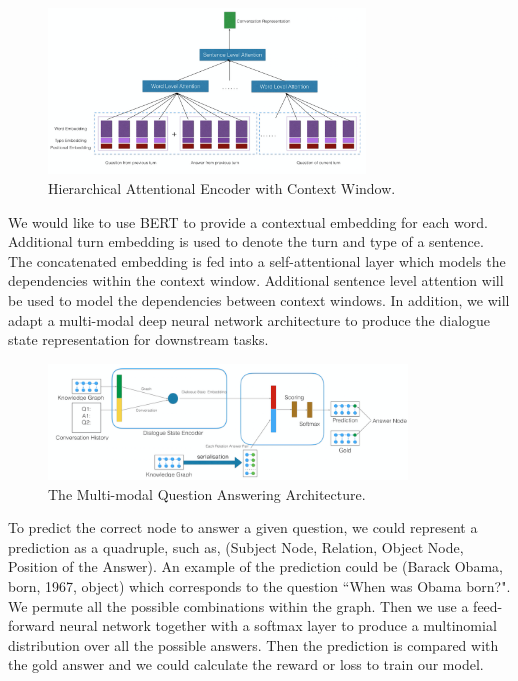 \documentclass[bsc,frontabs,twoside,singlespacing,parskip,deptreport]{infthesis}     %
\begin{document}
\begin{figure}[h]
    \centering
    \includegraphics[width=0.75\textwidth]{attemodel.png}
    \caption{Hierarchical Attentional Encoder with Context Window.}
    \label{fig:mesh1}
\end{figure}

We would like to use BERT\cite{devlin2018bert} to provide a contextual embedding for each word. Additional turn embedding is used to denote the turn and type of a sentence. The concatenated embedding is fed into a self-attentional layer which models the dependencies within the context window. Additional sentence level attention will be used to model the dependencies between context windows. In addition, we will adapt a multi-modal deep neural network architecture to produce the dialogue state representation for downstream tasks.

\begin{figure}[h]
    \centering
    \includegraphics[width=0.85\textwidth]{qa1pro.png}
    \caption{The Multi-modal Question Answering Architecture.}
    \label{fig:mesh1}
\end{figure}


To predict the correct node to answer a given question, we could represent a prediction as a quadruple, such as, (Subject Node, Relation, Object Node, Position of the Answer). An example of the prediction could be (Barack Obama, born, 1967, object) which corresponds to the question ``When was Obama born?". We permute all the possible combinations within the graph. Then we use a feed-forward neural network together with a softmax layer to produce a multinomial distribution over all the possible answers. Then the prediction is compared with the gold answer and we could calculate the reward or loss to train our model.
\end{document}
